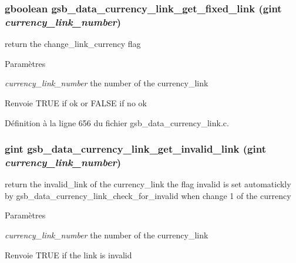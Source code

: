 \subsubsection[{gsb\_\-data\_\-currency\_\-link\_\-get\_\-fixed\_\-link}]{\setlength{\rightskip}{0pt plus 5cm}gboolean gsb\_\-data\_\-currency\_\-link\_\-get\_\-fixed\_\-link (gint {\em currency\_\-link\_\-number})}\label{gsb__data__currency__link_8c_a98c2a1a949a837d8a8e81273a1b5597a}
return the change\_\-link\_\-currency flag


\begin{DoxyParams}{Paramètres}
\item[{\em currency\_\-link\_\-number}]the number of the currency\_\-link\end{DoxyParams}
\begin{DoxyReturn}{Renvoie}
TRUE if ok or FALSE if no ok 
\end{DoxyReturn}


Définition à la ligne 656 du fichier gsb\_\-data\_\-currency\_\-link.c.

\subsubsection[{gsb\_\-data\_\-currency\_\-link\_\-get\_\-invalid\_\-link}]{\setlength{\rightskip}{0pt plus 5cm}gint gsb\_\-data\_\-currency\_\-link\_\-get\_\-invalid\_\-link (gint {\em currency\_\-link\_\-number})}\label{gsb__data__currency__link_8c_a43d077a96dc987da2527bb84cf830631}
return the invalid\_\-link of the currency\_\-link the flag invalid is set automatickly by gsb\_\-data\_\-currency\_\-link\_\-check\_\-for\_\-invalid when change 1 of the currency


\begin{DoxyParams}{Paramètres}
\item[{\em currency\_\-link\_\-number}]the number of the currency\_\-link\end{DoxyParams}
\begin{DoxyReturn}{Renvoie}
TRUE if the link is invalid 
\end{DoxyReturn}


